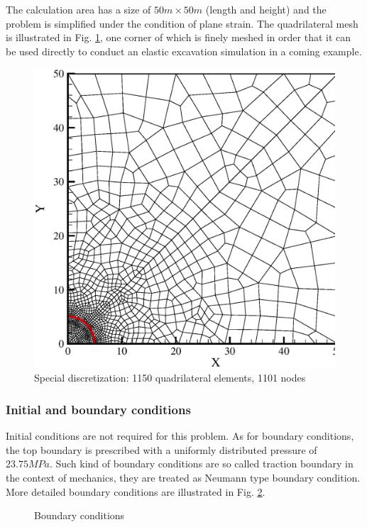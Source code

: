 The calculation area has a size of  $50m\times50m$ (length and height)
and the problem is simplified under the condition of plane strain.
The quadrilateral mesh is illustrated in Fig. \ref{fme:block},
   one corner of which is finely meshed in order that it can be used directly to
   conduct an elastic excavation simulation in a coming example.
\begin{figure}[!htb]
  \begin{center}
    \includegraphics[scale=0.3]{M/e1_mesh.eps}
  \end{center}
  \caption{Special discretization: 1150 quadrilateral elements, 1101 nodes }
  \label{fme:block}
\end{figure}
\subsubsection*{Initial and boundary conditions}
Initial conditions are not required for this problem. As for boundary conditions,
the top boundary is prescribed with a uniformly distributed pressure of $23.75MPa$. Such kind of boundary conditions
 are so called  traction boundary in the context of mechanics, they are treated as Neumann type boundary condition. More detailed boundary conditions are illustrated in Fig. \ref{fme:e1bc}.
\begin{figure}[!hbt]
  \centering
  
  \caption{Boundary conditions}
  \label{fme:e1bc}
\end{figure}
%

